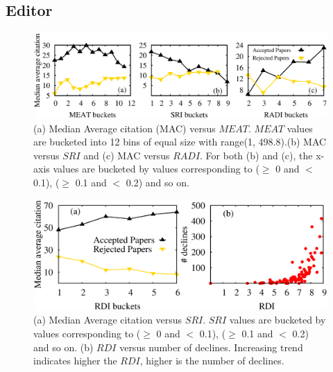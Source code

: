 \noindent
\subsection{Editor}
\label{editor}   

\begin{figure}
\centering
\includegraphics*[width=.8\textwidth]{./texfiles/Chapter_4/cikm/figures/editor_all.eps}
\caption{\label{fig3}(a) Median Average citation (MAC) versus $MEAT$. $MEAT$ values are bucketed into 12 bins of equal size with range(1, 498.8).(b) MAC versus $SRI$ and (c) MAC versus $RADI$. For both (b) and (c), the x-axis values are bucketed by values corresponding to ($\geq$ 0 and $<$ 0.1), ($\geq$ 0.1 and $<$ 0.2) and so on.}
\end{figure}

\begin{figure}[!ht]
\centering
\includegraphics[scale=0.3]{./texfiles/Chapter_4/cikm/figures/RDI_RDI_diversity.eps}
\caption{\label{fig_sri} (a) Median Average citation versus $SRI$. $SRI$ values are bucketed by values corresponding to ($\geq$ 0 and $<$ 0.1), ($\geq$ 0.1 and $<$ 0.2) and so on. (b) $RDI$ versus number of declines. Increasing trend indicates higher the $RDI$, higher is the number of declines.}
\vspace{3mm}
\end{figure}

